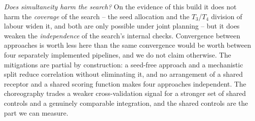 \emph{Does simultaneity harm the search?}
On the evidence of this build it does not harm the \emph{coverage} of
the search -- the seed allocation and the $T_3$/$T_4$ division of labour
widen it, and both are only possible under joint planning -- but it does
weaken the \emph{independence} of the search's internal checks.
Convergence between approaches is worth less here than the same
convergence would be worth between four separately implemented
pipelines, and we do not claim otherwise.
The mitigations are partial by construction: a seed-free approach and a
mechanistic split reduce correlation without eliminating it, and no
arrangement of a shared receptor and a shared scoring function makes
four approaches independent.
The choreography trades a weaker cross-validation signal for a stronger
set of shared controls and a genuinely comparable integration, and the
shared controls are the part we can measure.
